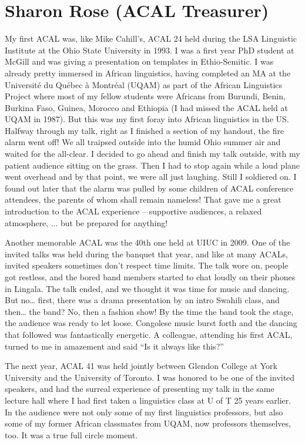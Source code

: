 \documentclass[output=paper]{langscibook}
\begin{document}
\section*{Sharon Rose (ACAL Treasurer)}

My first ACAL was, like Mike Cahill’s, ACAL 24 held during the LSA Linguistic Institute at the Ohio State University in 1993. I was a first year PhD student at McGill and was giving a presentation on templates in Ethio-Semitic. I was already pretty immersed in African linguistics, having completed an MA at the Université du Québec à Montréal (UQAM) as part of the African Linguistics Project where most of my fellow students were Africans from Burundi, Benin, Burkina Faso, Guinea, Morocco and Ethiopia (I had missed the ACAL held at UQAM in 1987). But this was my first foray into African linguistics in the US. Halfway through my talk, right as I finished a section of my handout, the fire alarm went off! We all traipsed outside into the humid Ohio summer air and waited for the all-clear. I decided to go ahead and finish my talk outside, with my patient audience sitting on the grass. Then I had to stop again while a loud plane went overhead and by that point, we were all just laughing. Still I soldiered on. I found out later that the alarm was pulled by some children of ACAL conference attendees, the parents of whom shall remain nameless! That gave me a great introduction to the ACAL experience -- supportive audiences, a relaxed atmosphere, ... but be prepared for anything!

Another memorable ACAL was the 40th one held at UIUC in 2009. One of the invited talks was held during the banquet that year, and like at many ACALs, invited speakers sometimes don’t respect time limits. The talk wore on, people got restless, and the bored band members started to chat loudly on their phones in Lingala. The talk ended, and we thought it was time for music and dancing. But no… first, there was a drama presentation by an intro Swahili class, and then… the band? No, then a fashion show! By the time the band took the stage, the audience was ready to let loose. Congolese music burst forth and the dancing that followed was fantastically energetic. A colleague, attending his first ACAL, turned to me in amazement and said “Is it always like this?” 

The next year, ACAL 41 was held jointly between Glendon College at York University and the University of Toronto. I was honored to be one of the invited speakers, and had the surreal experience of presenting my talk in the same lecture hall where I had first taken a linguistics class at U of T 25 years earlier. In the audience were not only some of my first linguistics professors, but also some of my former African classmates from UQAM, now professors themselves, too. It was a true full circle moment.
\end{document}
